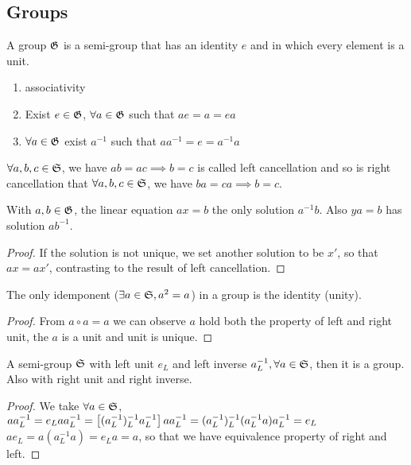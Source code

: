 	\subsection{Groups}
		\begin{definition}
		A group $\group$ is a semi-group that has an identity $e$ and in which every element is a unit.
		\begin{enumerate}
		\item associativity
		\item Exist $e\in\group$, $\forall a\in\group$ such that $ae=a=ea$
		\item $\forall a\in\group$ exist $a^{-1}$ such that $aa^{-1}=e=a^{-1}a$
		\end{enumerate}
		\end{definition}
		\begin{definition}
		$\forall a,b,c\in\semiG$, we have $ab=ac\implies b=c$ is called left cancellation and so is right cancellation that $\forall a,b,c\in\semiG$, we have $ba=ca\implies b=c$.
		\end{definition}
		\begin{theorem}\label{eqingroup}
		With $a,b\in\group$, the linear equation $ax=b$ the only solution $a^{-1}b$. Also $ya=b$ has solution $ab^{-1}$.
		\end{theorem}
		\begin{proof}
		If the solution is not unique, we set another solution to be $x'$, so that $ax=ax'$, contrasting to the result of left cancellation.
		\end{proof}
		\begin{theorem}
		The only idemponent ($\exists a\in\semiG, a^2=a$) in a group is the identity (unity).
		\end{theorem}
		\begin{proof}
		From $a\circ a=a$ we can observe $a$ hold both the property of left and right unit, the $a$ is a unit and unit is unique.
		\end{proof}
		\begin{theorem}
		A semi-group $\semiG$ with left unit $e_L$ and left inverse $a^{-1}_L, \forall a\in\semiG$, then it is a group. Also with right unit and right inverse.
		\end{theorem}
		\begin{proof}
		We take $\forall a\in\semiG$, $aa^{-1}_L=e_Laa^{-1}_L=\lr[]{(a^{-1}_L)^{-1}_La^{-1}_L}aa^{-1}_L=(a^{-1}_L)^{-1}_L(a^{-1}_La)a^{-1}_L=e_L$\\
		$ae_L=a(a^{-1}_La)=e_La=a$, so that we have equivalence property of right and left. 
		\end{proof}
